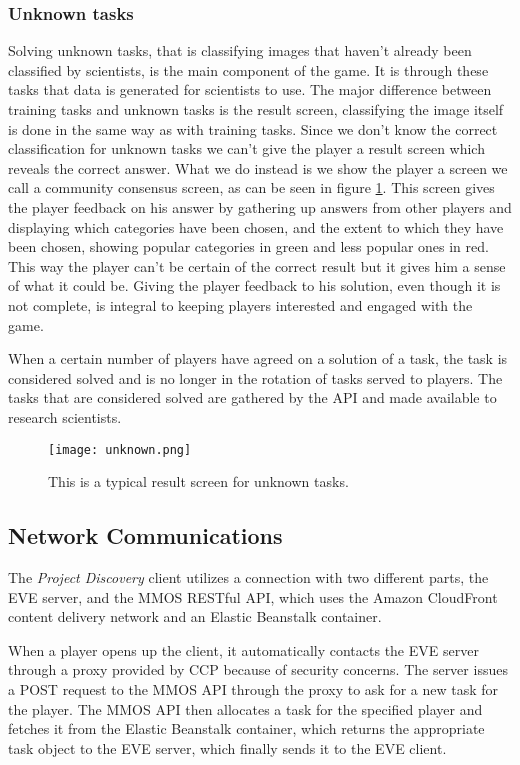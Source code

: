 \subsubsection{Unknown tasks}
Solving unknown tasks, that is classifying images that haven't already been classified by scientists, is the main component of the game. It is through these tasks that data is generated for scientists to use. The major difference between training tasks and unknown tasks is the result screen, classifying the image itself is done in the same way as with training tasks. Since we don't know the correct classification for unknown tasks we can't give the player a result screen which reveals the correct answer. What we do instead is we show the player a screen we call a community consensus screen, as can be seen in figure \ref{fig:unknown}. This screen gives the player feedback on his answer by gathering up answers from other players and displaying which categories have been chosen, and the extent to which they have been chosen, showing popular categories in green and less popular ones in red. This way the player can't be certain of the correct result but it gives him a sense of what it could be. Giving the player feedback to his solution, even though it is not complete, is integral to keeping players interested and engaged with the game.

When a certain number of players have agreed on a solution of a task, the task is considered solved and is no longer in the rotation of tasks served to players. The tasks that are considered solved are gathered by the API and made available to research scientists.

\begin{figure}[H]
\centering
\graphicspath{ {./graphics/} }
\centerline{\texttt{[image: unknown.png]}}
\caption{\label{fig:unknown} This is a typical result screen for unknown tasks.}
\end{figure}

\subsection{Network Communications}
The \emph{Project Discovery} client utilizes a connection with two different parts, the EVE server, and the MMOS RESTful API, which uses the Amazon CloudFront content delivery network and an Elastic Beanstalk container.

When a player opens up the client, it automatically contacts the EVE server through a proxy provided by CCP because of security concerns. The server issues a POST request to the MMOS API through the proxy to ask for a new task for the player. The MMOS API then allocates a task for the specified player and fetches it from the Elastic Beanstalk container, which returns the appropriate task object to the EVE server, which finally sends it to the EVE client. 

